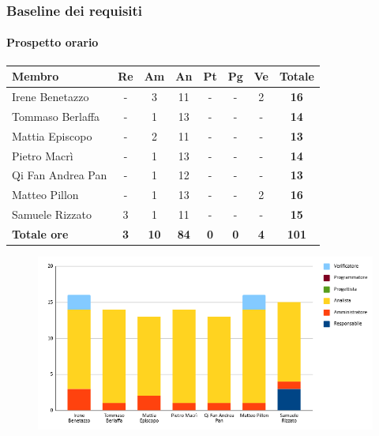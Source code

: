 \subsubsection{Baseline dei requisiti}
\paragraph{Prospetto orario}
\begin{center}
	\renewcommand{\arraystretch}{1.8} %
	\begin{tabular}{ |m{10em}|c|c|c|c|c|c|c| }
	\hline
	\textbf{Membro} & \textbf{Re} & \textbf{Am} &  \textbf{An} &  \textbf{Pt} &  \textbf{Pg} &  \textbf{Ve} &  \textbf{Totale}\\
    \hline
    Irene Benetazzo   & - & 3 & 11 & - & - & 2 & \textbf{16} \\
    \hline
    Tommaso Berlaffa  & - & 1 & 13 & - & - & - & \textbf{14} \\
    \hline
    Mattia Episcopo   & - & 2 & 11 & - & - & - & \textbf{13} \\
    \hline
    Pietro Macrì      & - & 1 & 13 & - & - & - & \textbf{14} \\
    \hline
    Qi Fan Andrea Pan & - & 1 & 12 & - & - & - & \textbf{13} \\
    \hline
    Matteo Pillon     & - & 1 & 13 & - & - & 2 & \textbf{16} \\
    \hline
    Samuele Rizzato   & 3 & 1 & 11 & - & - & - & \textbf{15} \\
    \hline
    \textbf{Totale ore} & \textbf{3} & \textbf{10} &  \textbf{84} &  \textbf{0} &  \textbf{0} &  \textbf{4} &  \textbf{101}\\
    \hline
	\end{tabular}
\end{center}
\begin{figure}[H]
    \centering\includegraphics[width=\textwidth, height=\textheight,keepaspectratio]{images/preventivo/RTB-requisiti-ore.png}
\end{figure}

